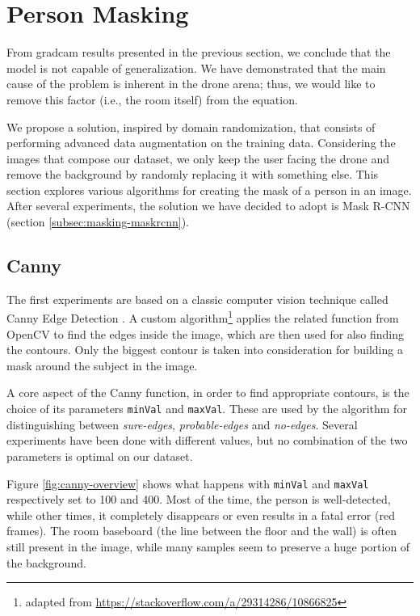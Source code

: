\section{Person Masking}
\label{sec:masking}

From \gls{gradcam} results presented in the previous section, we conclude that the model is not capable of generalization. We have demonstrated that the main cause of the problem is inherent in the drone arena; thus, we would like to remove this factor (i.e., the room itself) from the equation.

We propose a solution, inspired by domain randomization, that consists of performing advanced data augmentation on the training data. Considering the images that compose our dataset, we only keep the user facing the drone and remove the background by randomly replacing it with something else. This section explores various algorithms for creating the mask of a person in an image. After several experiments, the solution we have decided to adopt is Mask R-CNN (section \ref{subsec:masking-maskrcnn}).



\subsection{Canny}
\label{subsec:masking-canny}

The first experiments are based on a classic computer vision technique called Canny Edge Detection \cite{canny1986}. A custom algorithm\footnote{adapted from \url{https://stackoverflow.com/a/29314286/10866825}} applies the related function from OpenCV \cite{opencv_canny} to find the edges inside the image, which are then used for also finding the contours. Only the biggest contour is taken into consideration for building a mask around the subject in the image.

\medskip

A core aspect of the Canny function, in order to find appropriate contours, is the choice of its parameters \texttt{minVal} and \texttt{maxVal}. These are used by the algorithm for distinguishing between \textit{sure-edges}, \textit{probable-edges} and \textit{no-edges}. Several experiments have been done with different values, but no combination of the two parameters is optimal on our dataset.

Figure \ref{fig:canny-overview} shows what happens with \texttt{minVal} and \texttt{maxVal} respectively set to 100 and 400. Most of the time, the person is well-detected, while other times, it completely disappears or even results in a fatal error (red frames). The room baseboard (the line between the floor and the wall) is often still present in the image, while many samples seem to preserve a huge portion of the background.

